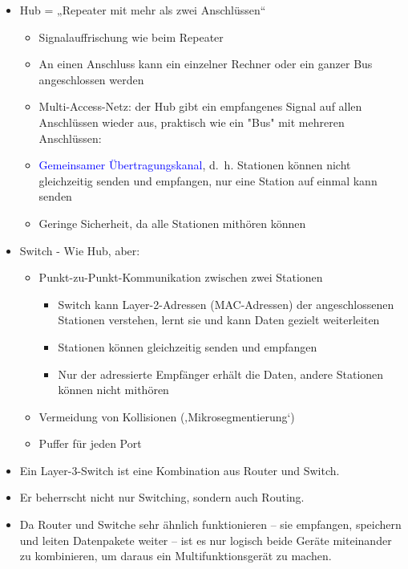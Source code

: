 \begin{itemize}
    \item Hub = „Repeater mit mehr als zwei Anschlüssen“
    \begin{itemize}
        \item Signalauffrischung wie beim Repeater
        \item An einen Anschluss kann ein einzelner Rechner oder ein ganzer Bus angeschlossen werden
        \item Multi-Access-Netz: der Hub gibt ein empfangenes Signal auf allen Anschlüssen wieder aus, praktisch wie ein "Bus" mit mehreren Anschlüssen:
        \item \textcolor{blue}{Gemeinsamer Übertragungskanal}, d.\ h. Stationen können nicht gleichzeitig senden und empfangen, nur eine Station auf einmal kann senden
        \item Geringe Sicherheit, da alle Stationen mithören können
    \end{itemize}
    \item Switch - Wie Hub, aber:
    \begin{itemize}
        \item Punkt-zu-Punkt-Kommunikation zwischen zwei Stationen
        \begin{itemize}
            \item Switch kann Layer-2-Adressen (MAC-Adressen) der angeschlossenen Stationen verstehen, lernt sie und kann Daten gezielt weiterleiten
            \item Stationen können gleichzeitig senden und empfangen
            \item Nur der adressierte Empfänger erhält die Daten, andere Stationen können nicht mithören
        \end{itemize}
        \item Vermeidung von Kollisionen (‚Mikrosegmentierung‘)
        \item Puffer für jeden Port
    \end{itemize}
\end{itemize}

\begin{itemize}
    \item Ein Layer-3-Switch ist eine Kombination aus Router und Switch.
    \item Er beherrscht nicht nur Switching, sondern auch Routing.
    \item Da Router und Switche sehr ähnlich funktionieren – sie empfangen, speichern und leiten Datenpakete weiter – ist es nur logisch beide Geräte miteinander zu kombinieren, um daraus ein Multifunktionsgerät zu machen.
\end{itemize}

